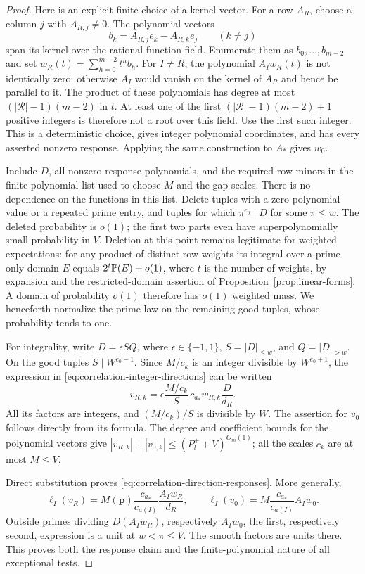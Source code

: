\begin{proof}
Here is an explicit finite choice of a kernel vector.  For a row $A_R$,
choose a column $j$ with $A_{R,j}\ne0$.  The polynomial vectors
\[
 b_k=A_{R,j}e_k-A_{R,k}e_j\qquad(k\ne j)
\]
span its kernel over the rational function field.  Enumerate them as
$b_0,\ldots,b_{m-2}$ and set $w_R(t)=\sum_{h=0}^{m-2}t^hb_h$.
For $I\ne R$, the polynomial $A_Iw_R(t)$ is not identically zero:
otherwise $A_I$ would vanish on the kernel of $A_R$ and hence be
parallel to it.  The product of these polynomials has degree at most
$(|\mathcal R|-1)(m-2)$ in $t$.  At least one of the first
$(|\mathcal R|-1)(m-2)+1$ positive integers is therefore not a root
over this field.  Use the first such integer.  This is a deterministic
choice, gives integer polynomial coordinates, and has every asserted
nonzero response.  Applying the same construction to $A_*$ gives
$w_0$.

Include $D$, all nonzero response polynomials, and the required row
minors in the finite polynomial list used to choose $M$ and the gap
scales.  There is no dependence on the functions in this list.
Delete tuples with a zero polynomial value or a repeated prime entry,
and tuples for which $\pi^{e_0}\mid D$ for some $\pi\le w$.
The deleted probability is $o(1)$; the first two parts even have
superpolynomially small probability in $V$.
Deletion at this point remains legitimate for weighted expectations:
for any product of distinct row weights its integral over a prime-only
domain $E$ equals $2^t\mathbb P(E)+o(1)$, where $t$ is the number of weights,
by expansion and the restricted-domain assertion of
Proposition~\ref{prop:linear-forms}.  A domain of probability $o(1)$
therefore has $o(1)$ weighted mass.  We henceforth normalize the prime
law on the remaining good tuples, whose probability tends to one.

For integrality, write $D=\epsilon S Q$, where $\epsilon\in\{-1,1\}$,
$S=|D|_{\le w}$, and $Q=|D|_{>w}$.  On the good tuples
$S\mid W^{e_0-1}$.  Since $M/c_k$ is an integer divisible by
$W^{e_0+1}$, the expression in \eqref{eq:correlation-integer-directions}
can be written
\[
 v_{R,k}=
 \epsilon\frac{M/c_k}{S}\,c_{a_*}w_{R,k}\frac{D}{d_R}.
\]
All its factors are integers, and $(M/c_k)/S$ is divisible by $W$.
The assertion for $v_0$ follows directly from its formula.
The degree and coefficient bounds for the polynomial vectors give
$|v_{R,k}|+|v_{0,k}|\le(P_l^++V)^{O_m(1)}$; all the scales $c_k$
are at most $M\le V$.

Direct substitution proves \eqref{eq:correlation-direction-responses}.
More generally,
\[
 \ell_I(v_R)=M(\boldsymbol p)\frac{c_{a_*}}{c_{a(I)}}
                   \frac{A_Iw_R}{d_R},\qquad
 \ell_I(v_0)=M\frac{c_{a_*}}{c_{a(I)}}A_Iw_0.
\]
Outside primes dividing $D(A_Iw_R)$, respectively $A_Iw_0$, the first,
respectively second, expression is a unit at $w<\pi\le V$.
The smooth factors are units there.  This proves both the response
claim and the finite-polynomial nature of all exceptional tests.
\end{proof}

